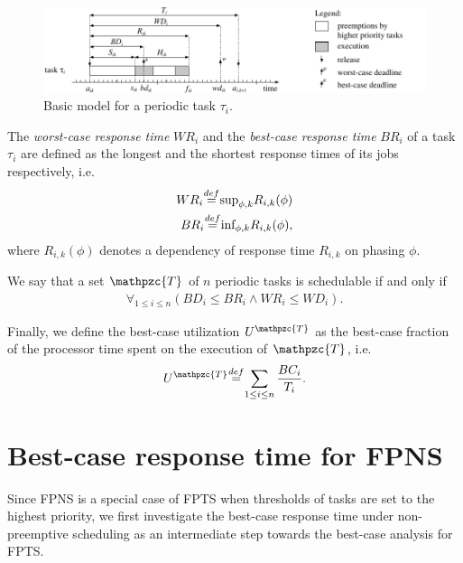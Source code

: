 \documentclass[conference,compsoc]{IEEEtran}
\newcommand\defeq{\stackrel{\mathclap{\tiny\mbox{def}}}{=}}
\begin{document}
\begin{figure}
	\centering
	\includegraphics[width=1\linewidth]{fig/task_model}
	\caption{Basic model for a periodic task $\tau_i$.}
	\label{fig:taskmodel}
\end{figure}

The \textit{worst-case response time} $WR_i$ and the \textit{best-case response time} $BR_i$ of a task $\tau_i$ are defined as the longest and the shortest response times of its jobs respectively, i.e.
\begin{align}
	WR_i \defeq \text{sup}_{\phi,k} R_{i,k}(\phi)\\
	BR_i \defeq \text{inf}_{\phi,k} R_{i,k}(\phi),
\end{align}
where $R_{i,k}(\phi)$ denotes a dependency of response time $R_{i,k}$ on phasing $\phi$.

We say that a set $\mathpzc{T}$ of $n$ periodic tasks is schedulable if and only if
\begin{align}
	\displaystyle\mathop{\forall}_{1 \leq i \leq n}(BD_i\leq BR_i \land WR_i\leq WD_i).
\end{align}

Finally, we define the best-case utilization $U^{\mathpzc{T}}$ as the best-case fraction of the  processor time spent on the execution of $\mathpzc{T}$, i.e.
\begin{align}
	U^{\mathpzc{T}} \defeq \sum_{1\leq i \leq n} \frac{BC_i}{T_i}.
\end{align} 


\section{Best-case response time for FPNS}
Since FPNS is a special case of FPTS when thresholds of tasks are set to the highest priority, we first investigate the best-case response time under non-preemptive scheduling as an intermediate step towards the best-case analysis for FPTS.
\end{document}
